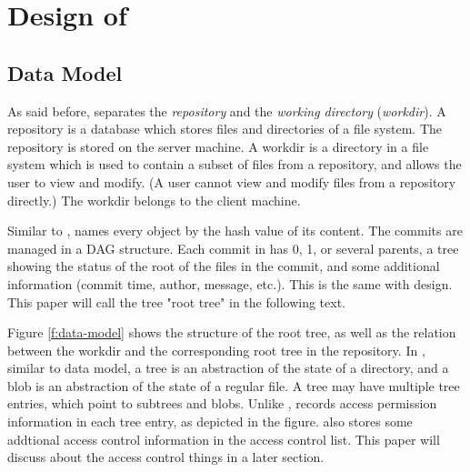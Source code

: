 \section{Design of \sys}
\label{s:design}

%


\subsection{Data Model}

As said before, \sys separates the \emph{repository} and the \emph{working
directory} (\emph{workdir}). A repository is a database which stores files
and directories of a file system. The repository is stored on the server
machine. A workdir is a directory in a file system which is used to
contain a subset of files from a repository, and allows the user to view and
modify. (A user cannot view and modify files from a repository directly.) The
workdir belongs to the client machine.

Similar to \git, \sys names every object by the hash value of its content.
The commits are managed in a DAG structure.%
Each commit in \sys has 0, 1, or several parents, a tree showing the status of the root of the files in the commit, and
some additional information (commit time, author, message, etc.). This is the
same with \git design. This paper will call the tree "root tree" in the
following text.



Figure \ref{f:data-model} shows the structure of the root tree, as well as the
relation between the workdir and the corresponding root tree in the repository.
In \sys, similar to \git data model, a tree is an abstraction of the state
of a directory, and a blob is an abstraction of the state of a regular file. A
tree may have multiple tree entries, which point to subtrees and blobs. Unlike
\git, \sys records access permission information in each tree entry, as depicted
in the figure. \sys also stores some addtional access control information in the
access control list. This paper will discuss about the access control things
in a later section.

